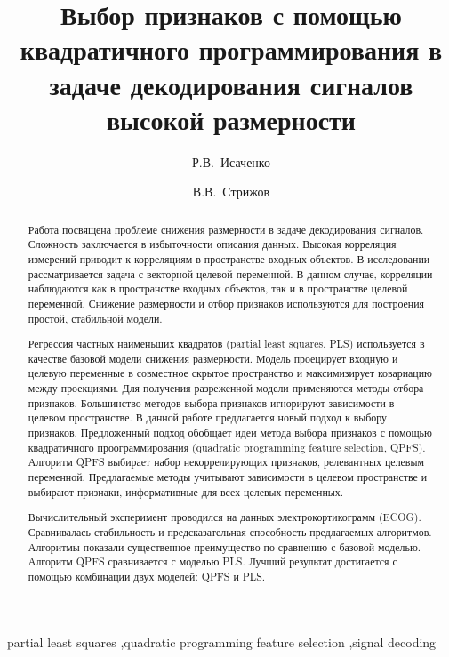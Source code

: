 \documentclass[preprint,12pt]{elsarticle}
\theoremstyle{definition}
\begin{document}
	\begin{frontmatter}
		\title{
			Выбор признаков с помощью квадратичного программирования в задаче декодирования сигналов высокой размерности}
		\author[mipt]{Р.В.~Исаченко}
		\author[ccas]{В.В.~Стрижов}
		
		\address[mipt]{
			Moscow Institute of Physics and Technology, 9 Institutskiy Per., Dolgoprudny, Moscow Region 141700, Russian Federation}
		\address[ccas]{A. A. Dorodnicyn Computing Centre, Federal Research Center “Computer Science and Control” of the Russian Academy of Sciences, 40 Vavilov Str., Moscow 119333, Russian Federation}
		
		\begin{abstract} 
			Работа посвящена проблеме снижения размерности в задаче декодирования сигналов.
			Сложность заключается в избыточности описания данных.
			Высокая корреляция измерений приводит к корреляциям в пространстве входных объектов.
			В исследовании рассматривается задача с векторной целевой переменной.
			В данном случае, корреляции наблюдаются как в пространстве входных объектов, так и в пространстве целевой переменной.
			Снижение размерности и отбор признаков используются для построения простой, стабильной модели.
			
			Регрессия частных наименьших квадратов (partial least squares, PLS) используется в качестве базовой модели снижения размерности.
			Модель проецирует входную и целевую переменные в совместное скрытое пространство и максимизирует ковариацию между проекциями.
			Для получения разреженной модели применяются методы отбора признаков.
			Большинство методов выбора признаков игнорируют зависимости в целевом пространстве.
			В данной работе предлагается новый подход к выбору признаков.
			Предложенный подход обобщает идеи метода выбора признаков с помощью квадратичного проограммирования (quadratic programming feature selection, QPFS).
			Алгоритм QPFS выбирает набор некоррелирующих признаков, релевантных целевым переменной.
			Предлагаемые методы учитывают зависимости в целевом пространстве и выбирают признаки, информативные для всех целевых переменных.
			
			Вычислительный эксперимент проводился на данных электрокортикограмм (ECOG).
			Сравнивалась стабильность и предсказательная способность предлагаемых алгоритмов.
			Алгоритмы показали существенное преимущество по сравнению с базовой моделью.
			Алгоритм QPFS сравнивается с моделью PLS.
			Лучший результат достигается с помощью комбинации двух моделей: QPFS и PLS.
			
		\end{abstract}
		\begin{keyword}
			partial least squares \sep quadratic programming feature selection \sep signal decoding
		\end{keyword}
	\end{frontmatter}
\end{document}

